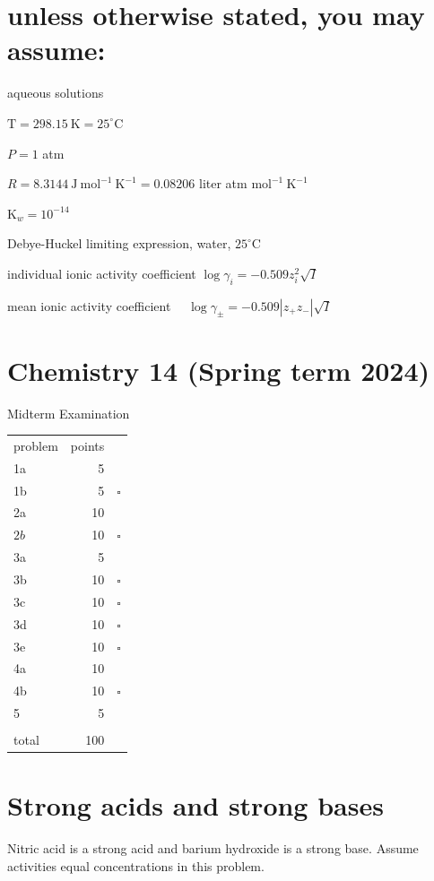 \documentclass[12pt]{article}
\begin{document}
\section*{unless otherwise stated, you may assume:}
aqueous solutions

$\mathrm{T}=298.15 \mathrm{~K}=25^{\circ} \mathrm{C}$

$P=1$ atm

$R=8.3144 \mathrm{~J} \mathrm{~mol}^{-1} \mathrm{~K}^{-1}=0.08206$ liter atm $\mathrm{mol}^{-1} \mathrm{~K}^{-1}$

$\mathrm{K}_{w}=10^{-14}$

Debye-Huckel limiting expression, water, $25^{\circ} \mathrm{C}$

individual ionic activity coefficient $\log \gamma_{i}=-0.509 z_{i}^{2} \sqrt{I}$

mean ionic activity coefficient $\quad \log \gamma_{ \pm}=-0.509\left|z_{+} z_{-}\right| \sqrt{I}$

\section*{Chemistry 14 (Spring term 2024)}
Midterm Examination

\begin{center}
\begin{tabular}{lrl}
problem & points &  \\
1a & 5 &  \\
1b & 5 & $\square$ \\
2a & 10 &  \\
$2 b$ & 10 & $\square$ \\
3a & 5 &  \\
3b & 10 & $\square$ \\
3c & 10 & $\square$ \\
3d & 10 & $\square$ \\
3e & 10 & $\square$ \\
4a & 10 &  \\
4b & 10 & $\square$ \\
5 & 5 &  \\
 &  &  \\
total & 100 &  \\
\end{tabular}
\end{center}

\section{Strong acids and strong bases}
Nitric acid is a strong acid and barium hydroxide is a strong base. Assume activities equal concentrations in this problem.
\end{document}
